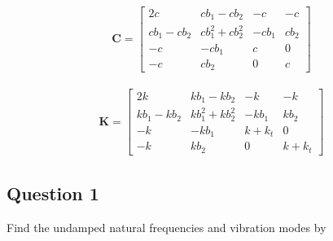 \documentclass[]{report}
\begin{document}
\begin{eqnarray*}
\mathbf{C}=\left[\begin{array}{cccc}
2c&cb_1-cb_2&-c&-c\\
cb_1-cb_2&cb_1^2+cb_2^2&-cb_1&cb_2 \\
-c&-cb_1&c&0 \\
-c&cb_2&0&c
\end{array}\right]
\end{eqnarray*}

\begin{eqnarray*}
\mathbf{K}=\left[\begin{array}{cccc}
2k&kb_1-kb_2&-k&-k\\
kb_1-kb_2&kb_1^2+kb_2^2&-kb_1&kb_2 \\
-k&-kb_1&k+k_t&0 \\
-k&kb_2&0&k+k_t
\end{array}\right]
\end{eqnarray*}

\subsection*{Question 1}
Find the undamped natural frequencies and vibration modes by
\end{document}
